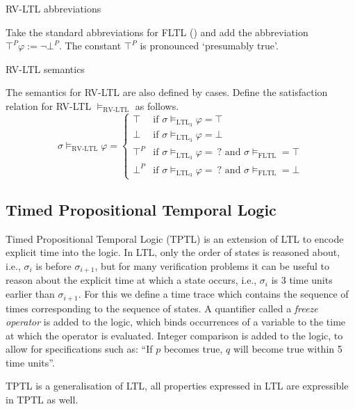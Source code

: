 \documentclass[a4paper]{article}
\newcommand{\tand}{\text{ and }}
\newcommand{\ltlt}{LTL$_3$}
\begin{document}
\begin{notn}{RV-LTL abbreviations}

  Take the standard abbreviations for FLTL () and add the abbreviation $\top^P \varphi:= \neg \bot^P$. The constant $\top^P$ is pronounced `presumably true'.
\end{notn}

\begin{defn}{RV-LTL semantics}

  The semantics for RV-LTL are also defined by cases.
  Define the satisfaction relation for RV-LTL $\vDash_{\text{RV-LTL}}$ as follows.
  \[\sigma\vDash_{\text{RV-LTL}}\varphi =
    \begin{cases}
      \top & \text{if } \sigma \vDash_{\text{\ltlt}} \varphi = \top\\
      \bot & \text{if } \sigma \vDash_{\text{\ltlt}} \varphi = \bot\\
      \top^P & \text{if } \sigma \vDash_{\text{\ltlt}} \varphi = ~?\tand \sigma\vDash_{\text{FLTL}} = \top \\
      \bot^P & \text{if } \sigma \vDash_{\text{\ltlt}} \varphi = ~?\tand \sigma\vDash_{\text{FLTL}} = \bot
    \end{cases}
  \]
\end{defn}


\subsection{Timed Propositional Temporal Logic}
Timed Propositional Temporal Logic (TPTL)\autocite{alur1994really} is an extension of LTL to encode explicit time into the logic.
In LTL, only the order of states is reasoned about, i.e., $\sigma_i$ is before $\sigma_{i+1}$, but for many verification problems it can be useful to reason about the explicit time at which a state occurs, i.e., $\sigma_i$ is 3 time units earlier than $\sigma_{i+1}$.
For this we define a time trace which contains the sequence of times corresponding to the sequence of states.
A quantifier called a \emph{freeze operator} is added to the logic, which binds occurrences of a variable to the time at which the operator is evaluated.
Integer comparison is added to the logic, to allow for specifications such as: ``If $p$ becomes true, $q$ will become true within 5 time units''.

TPTL is a generalisation of LTL, all properties expressed in LTL are expressible in TPTL as well.
\end{document}
